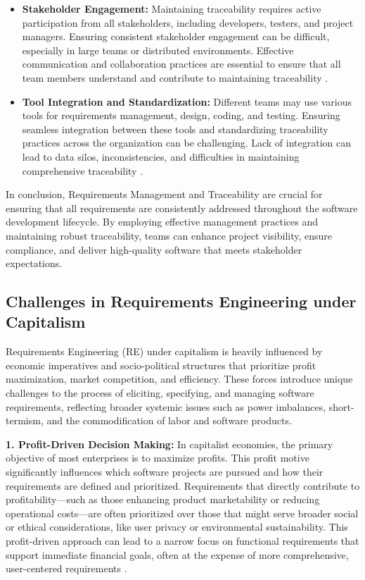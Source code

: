 \begin{refsection}
\begin{itemize}
    \item \textbf{Stakeholder Engagement:} Maintaining traceability requires active participation from all stakeholders, including developers, testers, and project managers. Ensuring consistent stakeholder engagement can be difficult, especially in large teams or distributed environments. Effective communication and collaboration practices are essential to ensure that all team members understand and contribute to maintaining traceability \cite[pp.~105-120]{bentley2007systems}.
    
    \item \textbf{Tool Integration and Standardization:} Different teams may use various tools for requirements management, design, coding, and testing. Ensuring seamless integration between these tools and standardizing traceability practices across the organization can be challenging. Lack of integration can lead to data silos, inconsistencies, and difficulties in maintaining comprehensive traceability \cite[pp.~240-260]{wiegers2013software}.
\end{itemize}

In conclusion, Requirements Management and Traceability are crucial for ensuring that all requirements are consistently addressed throughout the software development lifecycle. By employing effective management practices and maintaining robust traceability, teams can enhance project visibility, ensure compliance, and deliver high-quality software that meets stakeholder expectations.

\subsection{Challenges in Requirements Engineering under Capitalism}

Requirements Engineering (RE) under capitalism is heavily influenced by economic imperatives and socio-political structures that prioritize profit maximization, market competition, and efficiency. These forces introduce unique challenges to the process of eliciting, specifying, and managing software requirements, reflecting broader systemic issues such as power imbalances, short-termism, and the commodification of labor and software products.

\textbf{1. Profit-Driven Decision Making:} In capitalist economies, the primary objective of most enterprises is to maximize profits. This profit motive significantly influences which software projects are pursued and how their requirements are defined and prioritized. Requirements that directly contribute to profitability—such as those enhancing product marketability or reducing operational costs—are often prioritized over those that might serve broader social or ethical considerations, like user privacy or environmental sustainability. This profit-driven approach can lead to a narrow focus on functional requirements that support immediate financial goals, often at the expense of more comprehensive, user-centered requirements \cite[pp.~40-55]{robbins2019behavior}.


\end{refsection}

